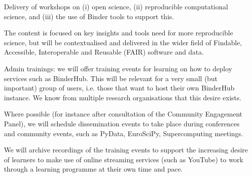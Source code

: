\begin{task}[
  title=Training Workshops for more reproducible science,
  id=workshops,
  lead=UIO,
  PM=9,
  partners={SRL,MP,IFR}
]
\begin{compactitem}

   \item Delivery of workshops on (i) open science, (ii) reproducible computational
     science, and (iii) the use of Binder tools to support this.

     The content is focused on key insights and tools need for more reproducible
     science, but will be contextualised and delivered in the wider field of
     Findable, Accessible, Interoperable and Reusable (FAIR) software and data.


   \item \TheProject Admin trainings: we will offer training events for learning on how to
     deploy \TheProject services such as BinderHub. This will be relevant for a
     very small (but important) group of users, i.e. those that want to host
     their own BinderHub instance. We know from multiple research organisations
     that this desire exists.

   \item Where possible (for instance after consultation of the Community Engagement Panel), 
     we will schedule dissemination events to take place
     during conferences and community events, such as PyData, EuroSciPy,
     Supercomputing meetings.

   \item We will archive recordings of the training events to support the
     increasing desire of learners to make use of online streaming services
     (such as YouTube) to work through a learning programme at their own time
     and pace.


\end{compactitem}
\end{task}
